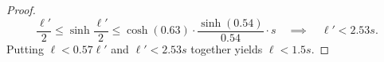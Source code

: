 \documentclass[11pt]{article}
\providecommand{\todo}[2][]{}
\newcommand{\Thomas}[1]{}
\renewcommand{\phi}{\varphi}
\begin{document}
\begin{proof}
    \begin{equation*}
        \frac{\ell'}{2} \le
        \sinh \frac{\ell'}{2} \le
        \cosh(0.63) \cdot \frac{\sinh(0.54)}{0.54} \cdot s
        \quad \implies \quad
        \ell' < 2.53 s.
    \end{equation*}
    Putting $\ell < 0.57\ell'$ and $\ell' < 2.53 s$ together yields $\ell < 1.5 s$.
%
%

\end{proof}
\end{document}
